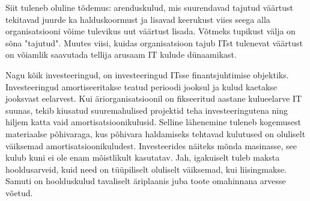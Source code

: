 \documentclass{tufte-book}
\begin{document}
Siit tuleneb oluline tõdemus: arenduskulud, mis suurendavad tajutud väärtust tekitavad juurde ka halduskoormust ja lisavad keerukust viies seega alla organisatsiooni võime tulevikus uut väärtust lisada. Võtmeks tupikust välja on sõna "tajutud". Muutes viisi, kuidas organisatsioon tajub ITst tulenevat väärtust on võiamlik saavutada tellija arusaam IT kulude dünaamikast.

Nagu kõik investeeringud, on investeeringud ITsse finantsjuhtimise objektiks. Investeeringud amortiseeritakse teatud perioodi  jooksul ja kulud kaetakse jooksvast eelarvest. Kui äriorganisatsioonil on fikseeritud aastane kulueelarve IT suunas, tekib kiusatud suuremahulised projektid teha investeeringutena ning hiljem katta vaid amortisatsioonikulusid. Selline lähenemine tuleneb kogemusest materiaalse põhivaraga, kus põhivara haldamiseks tehtavad kulutused on oluliselt väiksemad amortisatsioonikuludest. Investeerides näiteks mõnda masinasse, see kulub kuni ei ole enam mõistlikult kasutatav. Jah, igakuiselt tuleb maksta hooldusarveid, kuid need on tüüpiliselt oluliselt väiksemad, kui liisingmakse. Samuti on hoolduskulud tavaliselt äriplaanis juba toote omahinnana arvesse võetud. 
\end{document}
